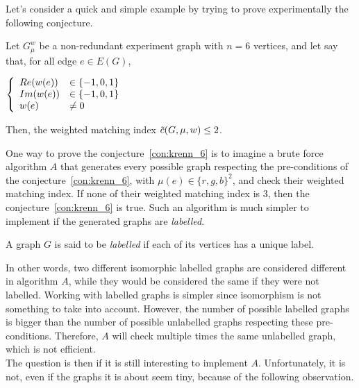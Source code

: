 Let's consider a quick and simple example by trying to prove experimentally the following conjecture.

\begin{conjecture}
    \label{con:krenn_6}
    Let $G_\mu^w$ be a non-redundant experiment graph with $n = 6$ vertices, and let say that, for all edge $e \in E(G)$,
    \begin{center}
        $\left\{\begin{array}{l l}
            Re(w(e)) & \in \{-1, 0, 1\} \\
            Im(w(e)) & \in \{-1, 0, 1\} \\
            w(e)     & \neq 0          \\
        \end{array}\right.$
    \end{center}
    Then, the weighted matching index $\Tilde{c}(G, \mu, w) \leq 2$.
\end{conjecture}


One way to prove the conjecture~\ref{con:krenn_6} is to imagine a brute force algorithm $A$ that generates every possible graph respecting the pre-conditions of the conjecture~\ref{con:krenn_6}, with $\mu(e) \in \{r, g, b\}^2$, and check their weighted matching index.
If none of their weighted matching index is $3$, then the conjecture~\ref{con:krenn_6} is true.
Such an algorithm is much simpler to implement if the generated graphs are \textit{labelled}.

\begin{definition}
    \label{def:labelled_graph}
    A graph $G$ is said to be \textit{labelled} if each of its vertices has a unique label.
\end{definition}

In other words, two different isomorphic labelled graphs are considered different in algorithm $A$, while they would be considered the same if they were not labelled.
Working with labelled graphs is simpler since isomorphism is not something to take into account.
However, the number of possible labelled graphs is bigger than the number of possible unlabelled graphs respecting these pre-conditions.
Therefore, $A$ will check multiple times the same unlabelled graph, which is not efficient.\\

The question is then if it is still interesting to implement $A$.
Unfortunately, it is not, even if the graphs it is about seem tiny, because of the following observation.

